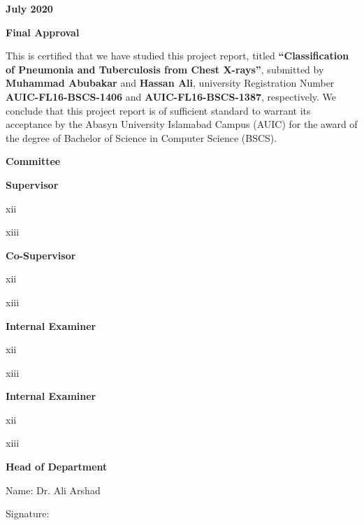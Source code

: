 \documentclass{article} %
\begin{document}
\noindent 

\noindent \textbf{July 2020}\eject 

\textbf{Final Approval}

\noindent This is certified that we have studied this project report, titled \textbf{``Classification of Pneumonia and Tuberculosis from Chest X-rays''}, submitted by \textbf{Muhammad Abubakar} and \textbf{Hassan Ali}, university Registration Number \textbf{AUIC-FL16-BSCS-1406} and \textbf{AUIC-FL16-BSCS-1387}, respectively. We conclude that this project report is of sufficient standard to warrant its acceptance by the Abasyn University Islamabad Campus (AUIC) for the award of the degree of Bachelor of Science in Computer Science (BSCS).

\textbf{    Committee}

\noindent \textbf{Supervisor}

\noindent 

\noindent xii

\noindent xiii

\noindent 

\noindent 

\noindent 

\noindent \textbf{Co-Supervisor}

\noindent 

\noindent xii

\noindent xiii

\noindent 

\noindent 

\noindent 

\noindent \textbf{Internal Examiner}

\noindent 

\noindent xii

\noindent xiii

\noindent 

\noindent 

\noindent 

\noindent \textbf{Internal Examiner}

\noindent 

\noindent xii

\noindent xiii

\noindent 

\noindent 

\noindent 

\noindent \textbf{Head of Department}

\noindent Name:  Dr. Ali Arshad

\noindent Signature: 
\end{document}
